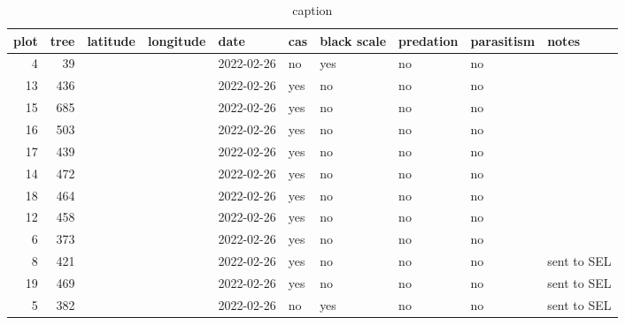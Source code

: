 \begin{table}
\centering
\caption{caption}
\label{leaf_samples_table}
\begin{tabular}{rrrrllllll}
\toprule
 plot &  tree &  latitude &  longitude &       date & cas & black scale & predation & parasitism &       notes \\
\midrule
    4 &    39 &           &            & 2022-02-26 &  no &         yes &        no &         no &             \\
   13 &   436 &           &            & 2022-02-26 & yes &          no &        no &         no &             \\
   15 &   685 &           &            & 2022-02-26 & yes &          no &        no &         no &             \\
   16 &   503 &           &            & 2022-02-26 & yes &          no &        no &         no &             \\
   17 &   439 &           &            & 2022-02-26 & yes &          no &        no &         no &             \\
   14 &   472 &           &            & 2022-02-26 & yes &          no &        no &         no &             \\
   18 &   464 &           &            & 2022-02-26 & yes &          no &        no &         no &             \\
   12 &   458 &           &            & 2022-02-26 & yes &          no &        no &         no &             \\
    6 &   373 &           &            & 2022-02-26 & yes &          no &        no &         no &             \\
    8 &   421 &           &            & 2022-02-26 & yes &          no &        no &         no & sent to SEL \\
   19 &   469 &           &            & 2022-02-26 & yes &          no &        no &         no & sent to SEL \\
    5 &   382 &           &            & 2022-02-26 &  no &         yes &        no &         no & sent to SEL \\
\bottomrule
\end{tabular}
\end{table}
